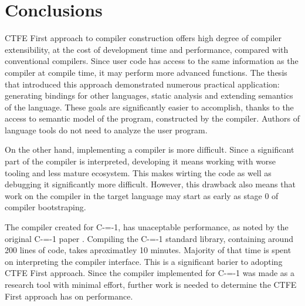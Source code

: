 \section{Conclusions}

CTFE First approach to compiler construction offers high degree of compiler extensibility, at the cost of development time and performance, compared with conventional compilers.
Since user code has access to the same information as the compiler at compile time, it may perform more advanced functions.
The thesis that introduced this approach \cite{grabski2020} demonstrated numerous practical application: generating bindings for other languages, static analysis and extending semantics of the language.
These goals are significantly easier to accomplish, thanks to the access to semantic model of the program, constructed by the compiler.
Authors of language tools do not need to analyze the user program.

On the other hand, implementing a compiler is more difficult.
Since a significant part of the compiler is interpreted, developing it means working with worse tooling and less mature ecosystem.
This makes wirting the code as well as debugging it significantly more difficult.
However, this drawback also means that work on the compiler in the target language may start as early as stage 0 of compiler bootstraping\cite{puntambekar:compiler_design, novillo2007gcc}.

The compiler created for C-=-1, has unaceptable performance, as noted by the original C-=-1 paper \cite{grabski2022compilation}.
Compiling the C-=-1 standard library, containing around 200 lines of code, takes aproximatley 10 minutes.
Majority of that time is spent on interpreting the compiler interface.
This is a significant barier to adopting CTFE First approach.
Since the compiler implemented for C-=-1 was made as a research tool with minimal effort, further work is needed to determine the CTFE First approach has on performance.
